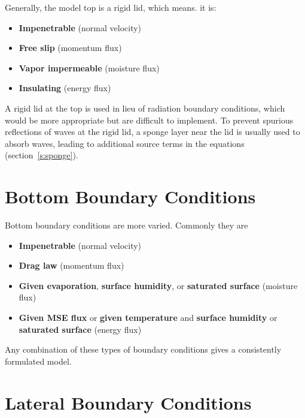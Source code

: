 \documentclass{report}
\begin{document}
Generally, the model top is a rigid lid, which means. it is:
\begin{itemize}
    \item \textbf{Impenetrable} (normal velocity)
    \item \textbf{Free slip} (momentum flux)
    \item \textbf{Vapor impermeable} (moisture flux)
    \item \textbf{Insulating} (energy flux)
\end{itemize}
A rigid lid at the top is used in lieu of radiation boundary conditions, which would be more appropriate but are difficult to implement. To prevent spurious reflections of waves at the rigid lid, a sponge layer near the lid is usually used to absorb waves, leading to additional source terms in the equations (section~\ref{s:sponge}).

\section{Bottom Boundary Conditions} \label{s:bottom_bc}

Bottom boundary conditions are more varied. Commonly they are
\begin{itemize}
    \item \textbf{Impenetrable} (normal velocity)
    \item \textbf{Drag law} (momentum flux)
    \item \textbf{Given evaporation}, \textbf{surface humidity}, or \textbf{saturated surface} (moisture flux)
    \item \textbf{Given MSE flux} or \textbf{given temperature} and \textbf{surface humidity} or \textbf{saturated surface} (energy flux)
\end{itemize}
Any combination of these types of boundary conditions gives a consistently formulated model.

\section{Lateral Boundary Conditions}
\end{document}
